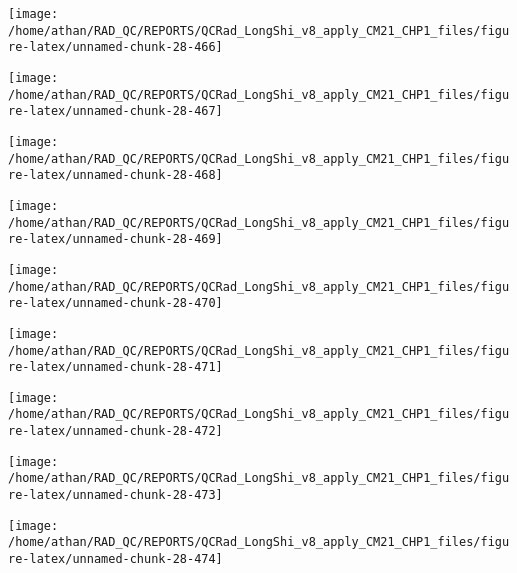 \documentclass[
  10pt,
  a4paper,oneside]{article}
\begin{document}
\begin{center}\texttt{[image: /home/athan/RAD\_QC/REPORTS/QCRad\_LongShi\_v8\_apply\_CM21\_CHP1\_files/figure-latex/unnamed-chunk-28-466]} \end{center}

\begin{center}\texttt{[image: /home/athan/RAD\_QC/REPORTS/QCRad\_LongShi\_v8\_apply\_CM21\_CHP1\_files/figure-latex/unnamed-chunk-28-467]} \end{center}

\begin{center}\texttt{[image: /home/athan/RAD\_QC/REPORTS/QCRad\_LongShi\_v8\_apply\_CM21\_CHP1\_files/figure-latex/unnamed-chunk-28-468]} \end{center}

\begin{center}\texttt{[image: /home/athan/RAD\_QC/REPORTS/QCRad\_LongShi\_v8\_apply\_CM21\_CHP1\_files/figure-latex/unnamed-chunk-28-469]} \end{center}

\begin{center}\texttt{[image: /home/athan/RAD\_QC/REPORTS/QCRad\_LongShi\_v8\_apply\_CM21\_CHP1\_files/figure-latex/unnamed-chunk-28-470]} \end{center}

\begin{center}\texttt{[image: /home/athan/RAD\_QC/REPORTS/QCRad\_LongShi\_v8\_apply\_CM21\_CHP1\_files/figure-latex/unnamed-chunk-28-471]} \end{center}

\begin{center}\texttt{[image: /home/athan/RAD\_QC/REPORTS/QCRad\_LongShi\_v8\_apply\_CM21\_CHP1\_files/figure-latex/unnamed-chunk-28-472]} \end{center}

\begin{center}\texttt{[image: /home/athan/RAD\_QC/REPORTS/QCRad\_LongShi\_v8\_apply\_CM21\_CHP1\_files/figure-latex/unnamed-chunk-28-473]} \end{center}

\begin{center}\texttt{[image: /home/athan/RAD\_QC/REPORTS/QCRad\_LongShi\_v8\_apply\_CM21\_CHP1\_files/figure-latex/unnamed-chunk-28-474]} \end{center}
\end{document}
